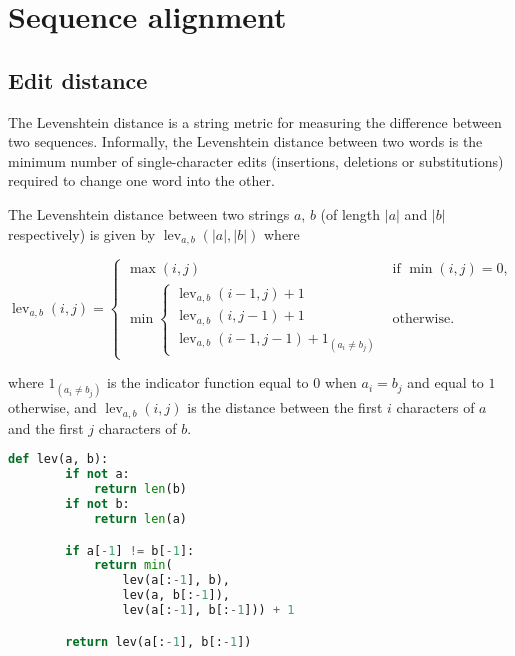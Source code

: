 \documentclass[slidestop]{beamer}
\begin{document}
\section{Sequence alignment}
\subsection{Edit distance}
\begin{pframe}
  The Levenshtein distance is a string metric for measuring the difference
  between two sequences. Informally, the Levenshtein distance between two words
  is the minimum number of single-character edits (insertions, deletions or
  substitutions) required to change one word into the other.
  \vfill

\end{pframe}

\begin{pframe}
  The Levenshtein distance between two strings $a$, $b$ (of length $|a|$ and
  $|b|$ respectively) is given by $\operatorname{lev}_{a, b}(|a|, |b|)$ where
  \bigskip

  \begin{math}
    \operatorname{lev}_{a, b}(i, j) = \begin{cases}
      \max(i, j) & \text{if } \min(i, j) = 0, \\
      \min \begin{cases}
        \operatorname{lev}_{a, b}(i - 1, j) + 1 \\
        \operatorname{lev}_{a, b}(i, j - 1) + 1 \\
        \operatorname{lev}_{a, b}(i - 1, j - 1) + 1_{(a_i \neq b_j)}
      \end{cases} & \text{otherwise.}
    \end{cases}
  \end{math}
  \bigskip

  where $1_{(a_i \neq b_j)}$ is the indicator function equal to $0$ when
  $a_i = b_j$ and equal to $1$ otherwise, and $\operatorname{lev}_{a, b}(i, j)$
  is the distance between the first $i$ characters of $a$ and the first $j$
  characters of $b$.
  \vfill

\end{pframe}

\begin{pframe}
  \begin{lstlisting}[language=python, caption={Recursive implementation.}]
    def lev(a, b):
        if not a:
            return len(b)
        if not b:
            return len(a)

        if a[-1] != b[-1]:
            return min(
                lev(a[:-1], b),
                lev(a, b[:-1]),
                lev(a[:-1], b[:-1])) + 1

        return lev(a[:-1], b[:-1])
  \end{lstlisting}
\end{pframe}
\end{document}
